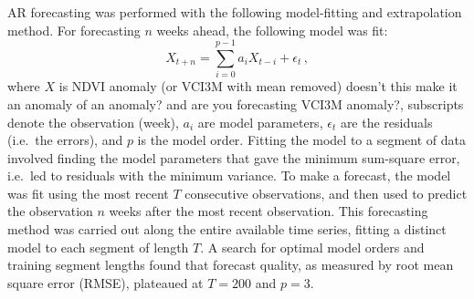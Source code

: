 \documentclass[review]{elsarticle}
\begin{document}
AR forecasting was performed with the following model-fitting and extrapolation method. For forecasting $n$ weeks ahead, the following model was fit:
\begin{equation}
X_{t+n}=\sum_{i=0}^{p-1}a_iX_{t-i}+\epsilon_t\,, \label{eq:AR1}
\end{equation}
where $X$ is NDVI anomaly (or VCI3M with mean removed) {\color{green} doesn't this make it an anomaly of an anomaly? and are you forecasting VCI3M anomaly?}, subscripts denote the observation (week), $a_i$ are model parameters, $\epsilon_t$ are the residuals (i.e.~the errors), and $p$ is the model order. Fitting the model to a segment of data involved finding the model parameters that gave the minimum sum-square error, i.e.~led to residuals with the minimum variance. To make a forecast, the model was fit using the most recent $T$ consecutive observations, and then used to predict the observation $n$ weeks after the most recent observation. This forecasting method was carried out along the entire available time series, fitting a distinct model to each segment of length $T$. A search for optimal model orders and training segment lengths found that forecast quality, as measured by root mean square error (RMSE), plateaued at $T=200$ and $p=3$.%




\end{document}
